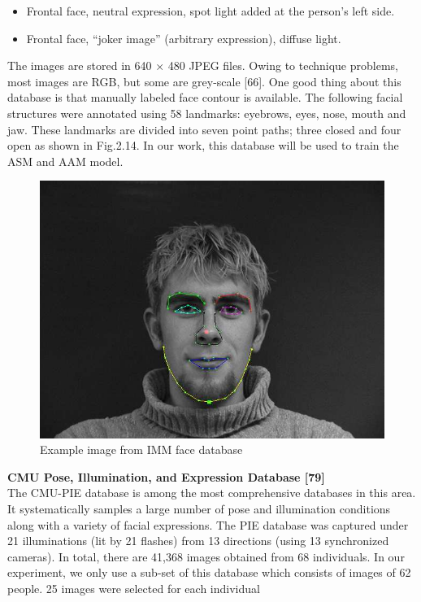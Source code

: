 \documentclass[12pt]{report}
\begin{document}
	
	\tableofcontents
	\newpage
	
	
	\onehalfspacing
	
	\begin{itemize}
		\item Frontal face, neutral expression, spot light added at the person’s left side.
		\item Frontal face, “joker image” (arbitrary expression), diffuse light.
	\end{itemize}
	\qquad The images are stored in 640 × 480 JPEG files. Owing to technique problems, most
	images are RGB, but some are grey-scale [66]. One good thing about this database is that
	manually labeled face contour is available. The following facial structures were annotated
	using 58 landmarks: eyebrows, eyes, nose, mouth and jaw. These landmarks are divided
	into seven point paths; three closed and four open as shown in Fig.2.14. In our work, this
	database will be used to train the ASM and AAM model.
	
	\begin{figure}[h]
		\centering
		\includegraphics[scale=0.5]{img/fig_2-14.png}
		\caption{Example image from IMM face database}
	\end{figure}
	\vspace{0.5cm}
	\noindent \textbf{CMU Pose, Illumination, and Expression Database [79]} \vspace{0.3cm} \\
	The CMU-PIE database is among the most comprehensive databases in this area. It
	systematically samples a large number of pose and illumination conditions along with a
	variety of facial expressions. The PIE database was captured under 21 illuminations (lit by
	21 flashes) from 13 directions (using 13 synchronized cameras). In total, there are 41,368
	images obtained from 68 individuals. In our experiment, we only use a sub-set of this
	database which consists of images of 62 people. 25 images were selected for each individual
	
\end{document}
